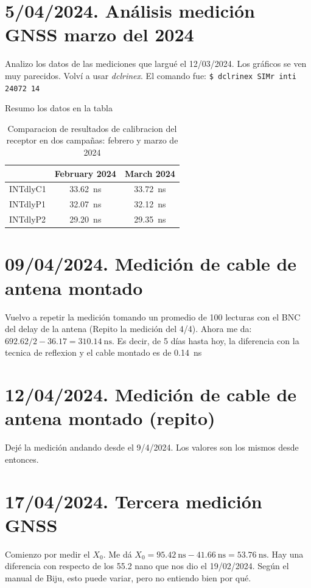 \documentclass[11pt]{article}
\begin{document}
\section{5/04/2024. Análisis medición GNSS marzo del 2024}
Analizo los datos de las mediciones que largué el 12/03/2024. Los gráficos se ven muy parecidos. Volví a usar \textit{dclrinex}. El comando fue: \texttt{\$ dclrinex SIMr inti 24072 14 }

Resumo los datos en la tabla 


\begin{table}[h]
    \centering
    \begin{tabular}{lcc}
         &  February 2024 & March 2024 \\
         \hline
    INTdlyC1     & \SI{33.62}{\nano\second}& \SI{33.72}{\nano\second}\\
    INTdlyP1     & \SI{32.07}{\nano\second}& \SI{32.12}{\nano\second}\\
    INTdlyP2     & \SI{29.20}{\nano\second}& \SI{29.35}{\nano\second}\\
    \end{tabular}
    \caption{Comparacion de resultados de calibracion del receptor en dos campañas: febrero y marzo de 2024}
    \label{tab:febrero-marzo}
\end{table}

\section{09/04/2024. Medición de cable de antena montado}

Vuelvo a repetir la medición tomando un promedio de 100 lecturas con el BNC del delay de la antena (Repito la medición del 4/4). Ahora me da: $692.62/2-36.17 = \SI{310.14}{\nano\second}$. Es decir, de 5 días hasta hoy, la diferencia con la tecnica de reflexion y el cable montado es de \SI{0.14}{\nano\second}

\section{12/04/2024. Medición de cable de antena montado (repito)}
Dejé la medición andando desde el 9/4/2024. Los valores son los mismos desde entonces.

\section{17/04/2024. Tercera medición GNSS}
Comienzo por medir el $X_0$. Me dá $X_0 = \SI{95.42}{\nano\second} - \SI{41.66}{\nano\second} = \SI{53.76}{\nano\second}$. Hay una diferencia con respecto de los 55.2 nano que nos dio el 19/02/2024. Según el manual de Biju, esto puede variar, pero no entiendo bien por qué.\\
\end{document}
